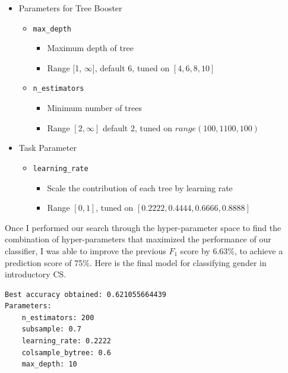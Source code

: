 \begin{itemize}
\item Parameters for Tree Booster
    \begin{itemize}
        \item \texttt{max\_depth}
        \begin{itemize}
            \item Maximum depth of tree
            \item Range [1, $\infty$], default 6, tuned on $[4, 6, 8, 10]$
        \end{itemize}
        \item \texttt{n\_estimators}
        \begin{itemize}
            \item Minimum number of trees
            \item Range $[2,\infty]$ default 2, tuned on $range(100, 1100, 100)$
        \end{itemize}

    \end{itemize}

\item Task Parameter
    \begin{itemize}
        \item \texttt{learning\_rate}
        \begin{itemize}
            \item Scale the contribution of each tree by learning rate
            \item Range $[0, 1]$, tuned on $[0.2222, 0.4444, 0.6666, 0.8888]$
        \end{itemize}
    \end{itemize}
\end{itemize}

Once I performed our search through the hyper-parameter space to find the combination of hyper-parameters that maximized the performance of our classifier, I was able to improve the previous $F_1$ score by 6.63\%, to achieve a prediction score of 75\%. Here is the final model for classifying gender in introductory CS. 
\begin{verbatim}
Best accuracy obtained: 0.621055664439
Parameters:
    n_estimators: 200
    subsample: 0.7
    learning_rate: 0.2222
    colsample_bytree: 0.6
    max_depth: 10

\end{verbatim}

